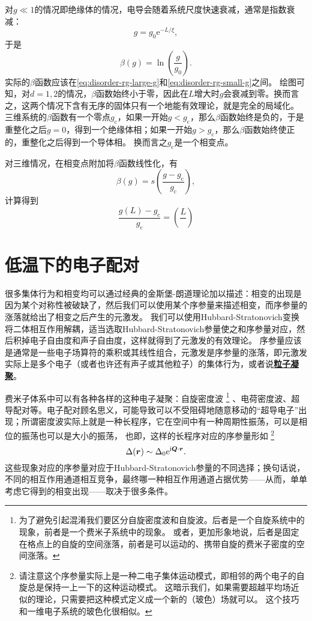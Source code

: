 \documentclass[hyperref, UTF8, a4paper]{ctexart}
\newcommand*{\ii}{\mathrm{i}}
\newcommand*{\ee}{\mathrm{e}}
\newcommand*{\concept}[1]{\underline{\textbf{#1}}}
\begin{document}
对$g \ll 1$的情况即绝缘体的情况，电导会随着系统尺度快速衰减，通常是指数衰减：
\[
    g = g_0 \ee^{- L / \xi},
\]
于是
\begin{equation}
    \beta(g) = \ln(\frac{g}{g_0}).
    \label{eq:disorder-rg-small-g}
\end{equation}
实际的$\beta$函数应该在\eqref{eq:disorder-rg-large-g}和\eqref{eq:disorder-rg-small-g}之间。
绘图可知，对$d=1, 2$的情况，$\beta$函数始终小于零，因此在$L$增大时$g$会衰减到零。换而言之，这两个情况下含有无序的固体只有一个地能有效理论，就是完全的局域化。
三维系统的$\beta$函数有一个零点$g_\text{c}$，如果一开始$g < g_\text{c}$，那么$\beta$函数始终是负的，于是重整化之后$g=0$，得到一个绝缘体相；如果一开始$g > g_\text{c}$，那么$\beta$函数始终使正的，重整化之后得到一个导体相。
换而言之$g_\text{c}$是一个相变点。

对三维情况，在相变点附加将$\beta$函数线性化，有
\begin{equation}
    \beta(g) = s \left( \frac{g - g_\text{c}}{g_\text{c}} \right),
\end{equation}
计算得到
\begin{equation}
    \frac{g(L) - g_\text{c}}{g_\text{c}} = \left( \frac{L}{} \right)
\end{equation}

\section{低温下的电子配对}\label{sec:low-and-super}

很多集体行为和相变均可以通过经典的金斯堡-朗道理论加以描述：相变的出现是因为某个对称性被破缺了，然后我们可以使用某个序参量来描述相变，而序参量的涨落就给出了相变之后产生的元激发。
我们可以使用Hubbard-Stratonovich变换将二体相互作用解耦，适当选取Hubbard-Stratonovich参量使之和序参量对应，然后积掉电子自由度和声子自由度，这样就得到了元激发的有效理论。
序参量应该是通常是一些电子场算符的乘积或其线性组合，元激发是序参量的涨落，即元激发实际上是多个电子（或者也许还有声子或其他粒子）的集体行为，或者说\concept{粒子凝聚}。

费米子体系中可以有各种各样的这种电子凝聚：自旋密度波%
\footnote{
    为了避免引起混淆我们要区分自旋密度波和自旋波。后者是一个自旋系统中的现象，前者是一个费米子系统中的现象。
    或者，更加形象地说，后者是固定在格点上的自旋的空间涨落，前者是可以运动的、携带自旋的费米子密度的空间涨落。
}%
、电荷密度波、超导配对等。电子配对顾名思义，可能导致可以不受阻碍地随意移动的“超导电子”出现；所谓密度波实际上就是一种长程序，它在空间中有一种周期性振荡，可以是相位的振荡也可以是大小的振荡，
也即，这样的长程序对应的序参量形如%
\footnote{请注意这个序参量实际上是一种二电子集体运动模式，即相邻的两个电子的自旋总是保持一上一下的这种运动模式。
这暗示我们，如果需要超越平均场近似的理论，只需要把这种模式定义成一个新的（玻色）场就可以。
这个技巧和一维电子系统的玻色化很相似。}%
\begin{equation}
    \Delta(\vb*{r}) \sim \Delta_0 \ee^{\ii \vb*{Q} \cdot \vb*{r}}.
\end{equation}
这些现象对应的序参量对应于Hubbard-Stratonovich参量的不同选择；换句话说，不同的相互作用通道相互竞争，最终哪一种相互作用通道占据优势——从而，单单考虑它得到的相变出现——取决于很多条件。
\end{document}
